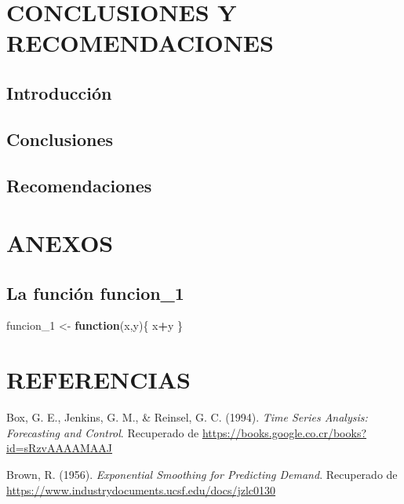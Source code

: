 \documentclass[
]{article}
\newenvironment{Shaded}{\begin{snugshade}}{\end{snugshade}}
\newcommand{\ControlFlowTok}[1]{\textcolor[rgb]{0.13,0.29,0.53}{\textbf{#1}}}
\newcommand{\DecValTok}[1]{\textcolor[rgb]{0.00,0.00,0.81}{#1}}
\newcommand{\NormalTok}[1]{#1}
\newcommand{\OperatorTok}[1]{\textcolor[rgb]{0.81,0.36,0.00}{\textbf{#1}}}
\newcommand{\StringTok}[1]{\textcolor[rgb]{0.31,0.60,0.02}{#1}}
\begin{document}
\newpage

\section{CONCLUSIONES Y RECOMENDACIONES}

\subsection{Introducción}

\subsection{Conclusiones}

\subsection{Recomendaciones}

\newpage

\section{ANEXOS}

\subsection{La función funcion\_1}

\label{funcion1}

\begin{Shaded}
\begin{Highlighting}[]
\NormalTok{funcion_}\DecValTok{1}\NormalTok{ <-}\StringTok{ }\ControlFlowTok{function}\NormalTok{(x,y)\{}
\NormalTok{    x}\OperatorTok{+}\NormalTok{y}
\NormalTok{\}}
\end{Highlighting}
\end{Shaded}

\newpage

\section{REFERENCIAS}

\hypertarget{refs}{}
\leavevmode\hypertarget{ref-box-jenkins}{}%
Box, G. E., Jenkins, G. M., \& Reinsel, G. C. (1994). \emph{Time Series
Analysis: Forecasting and Control}. Recuperado de
\url{https://books.google.co.cr/books?id=sRzvAAAAMAAJ}

\leavevmode\hypertarget{ref-brown}{}%
Brown, R. (1956). \emph{Exponential Smoothing for Predicting Demand}.
Recuperado de \url{https://www.industrydocuments.ucsf.edu/docs/jzlc0130}
\end{document}
